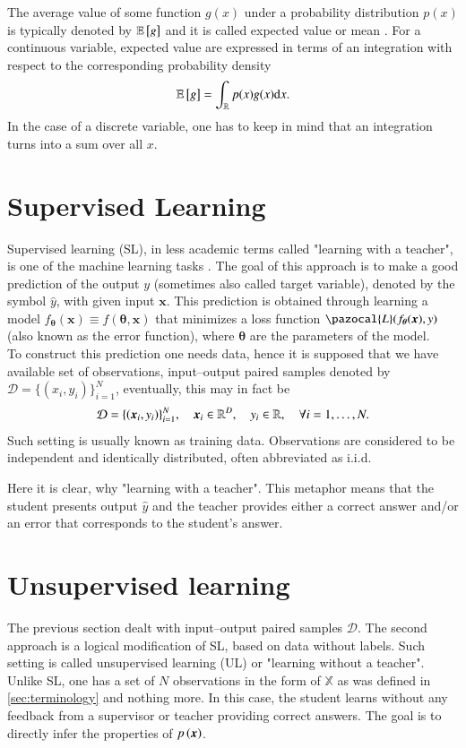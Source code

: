 The average value of some function $g(x)$ under a probability distribution $p(x)$ is typically denoted by $\mathbb{E}\left[ g \right]$ and it is called expected value or mean \cite{bishop}. For a continuous variable, expected value are expressed in terms of an integration with respect to the corresponding probability density
\begin{equation}
	\mathbb{E}\left[ g \right] = \int_{\mathbb{R}} p(x)g(x)\mathrm{d}{x}.
\end{equation} 
In the case of a discrete variable, one has to keep in mind that an integration turns into a sum over all $x$.   

\section{Supervised Learning}
Supervised learning (SL), in less academic terms called "learning with a teacher", is one of the machine learning tasks  \cite{supervised}.  The goal of this approach is to make a good prediction of the output $y$ (sometimes also called target variable), denoted by the symbol $\hat{y}$, with given input $\boldsymbol{x}$. This prediction is obtained through learning a model $f_{\boldsymbol{\theta}}\left(\boldsymbol{x}\right)\equiv f\left(\boldsymbol{\theta}, \boldsymbol{x}\right)$ that minimizes a loss function  $\pazocal{L}(f_{\boldsymbol{\theta}}(\boldsymbol{x}), y)$ (also known as the error function), where $\boldsymbol{\theta}$ are the parameters of the model. \\
To construct this prediction one needs data, hence it is supposed that we have available set of observations, input--output paired samples denoted by $\mathcal{D} = \lbrace \left(x_i , y_i \right)\rbrace_{i=1}^N$, eventually, this may in fact be 
\begin{equation}
\mathcal{D} = \lbrace\left( \boldsymbol{x}_i , y_i \right)\rbrace_{i=1}^N,\quad \boldsymbol{x}_i \in \mathbb{R}^D,\quad y_i \in \mathbb{R},\quad\forall i = 1,\dots,N.
\end{equation}
Such setting is usually known as training data.  Observations are considered to be independent and identically distributed, often abbreviated as i.i.d. 

Here it is clear, why "learning with a teacher". This metaphor means that the student presents output $\widehat{y}$ and the teacher provides either a correct answer and/or an error that corresponds to the student's answer. 

\section{Unsupervised learning}
The previous section dealt with input--output paired samples $\mathcal{D}$. The second approach is a logical modification of SL, based on data without labels. Such setting is called unsupervised learning (UL) or "learning without a teacher". Unlike SL, one has a set of $N$ observations in the form of $\mathbb{X}$ as was defined in \ref{sec:terminology} and nothing more. In this case, the student learns without any feedback from a supervisor or teacher providing correct answers. The goal is to directly infer the properties of $p\left( \boldsymbol{x} \right)$.

